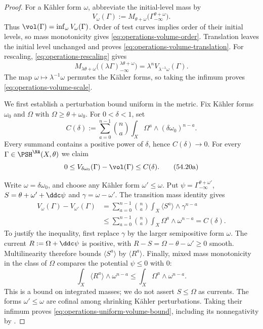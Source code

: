 \begin{proof}
For a K\"ahler form $\omega$, abbreviate the initial-level mass by
\[
 V_\omega(\Gamma)
 :=M_{\theta+\omega}
       \bigl(\Gamma_{-\infty}^{\theta+\omega}\bigr).
\]
Thus $\vol(\Gamma)=\inf_\omega V_\omega(\Gamma)$.
Order of test curves implies order of their initial levels, so
mass monotonicity gives \eqref{eq:operations-volume-order}.
Translation leaves the initial level unchanged and proves
\eqref{eq:operations-volume-translation}.
For rescaling, \eqref{eq:operations-rescaling} gives
\[
 M_{\lambda\theta+\omega}
       \bigl((\lambda\Gamma)_{-\infty}^{\lambda\theta+\omega}\bigr)
 =\lambda^n V_{\lambda^{-1}\omega}(\Gamma).
\]
The map $\omega\mapsto\lambda^{-1}\omega$ permutes the K\"ahler
forms, so taking the infimum proves
\eqref{eq:operations-volume-scale}.

We first establish a perturbation bound uniform in the metric.
Fix K\"ahler forms $\omega_0$ and $\Omega$ with
$\Omega\geq\theta+\omega_0$.
For $0<\delta<1$, set
\[
 C(\delta):=
 \sum_{a=0}^{n-1}\binom na
     \int_X\Omega^a\wedge(\delta\omega_0)^{n-a}.
\tag{54.20}\label{eq:operations-uniform-mass-error}
\]
Every summand contains a positive power of $\delta$, hence
$C(\delta)\to0$.
For every $\Gamma\in\PSH^{\NA}(X,\theta)$ we claim
\[
 0\leq V_{\delta\omega_0}(\Gamma)-\vol(\Gamma)
       \leq C(\delta).
\tag{54.20a}\label{eq:operations-uniform-volume-bound}
\]

Write $\omega=\delta\omega_0$, and choose any K\"ahler form
$\omega'\leq\omega$.
Put $\psi=\Gamma_{-\infty}^{\theta+\omega'}$,
$S=\theta+\omega'+\ddc\psi$ and $\gamma=\omega-\omega'$.
The transition mass identity
 gives
\[
 \begin{split}
 V_\omega(\Gamma)-V_{\omega'}(\Gamma)
 &=\sum_{a=0}^{n-1}\binom na
       \int_X\langle S^a\rangle\wedge\gamma^{n-a}\\
 &\leq\sum_{a=0}^{n-1}\binom na
       \int_X\Omega^a\wedge\omega^{n-a}
   =C(\delta).
 \end{split}
\]
To justify the inequality, first replace $\gamma$ by the larger
semipositive form $\omega$.
The current $R:=\Omega+\ddc\psi$ is positive, with
$R-S=\Omega-\theta-\omega'\geq0$ smooth.
Multilinearity therefore bounds
$\langle S^a\rangle$ by $\langle R^a\rangle$.
Finally, mixed mass monotonicity in the class of $\Omega$
compares the potential $\psi\leq0$ with $0$:
\[
 \int_X\langle R^a\rangle\wedge\omega^{n-a}
       \leq\int_X\Omega^a\wedge\omega^{n-a}.
\]
This is a bound on integrated masses; we do not assert
$S\leq\Omega$ as currents.
The forms $\omega'\leq\omega$ are cofinal among shrinking
K\"ahler perturbations. Taking their infimum proves
\eqref{eq:operations-uniform-volume-bound}, including its
nonnegativity by .


\end{proof}
